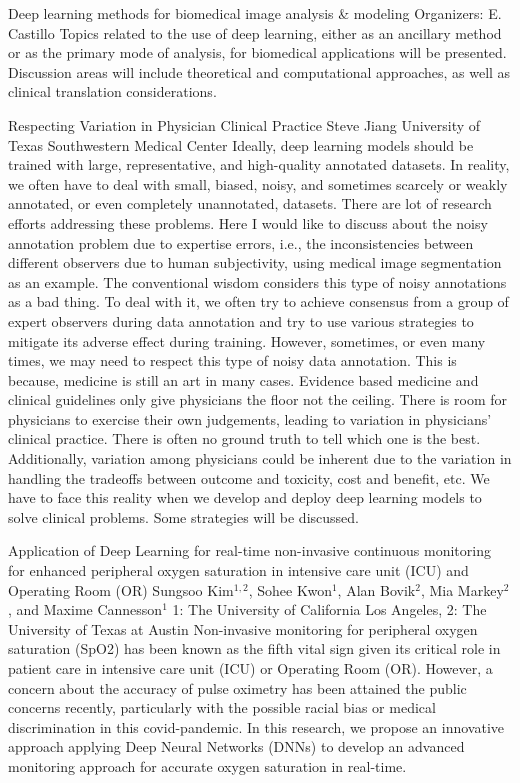 \label{mini05}

\miniabs
{Deep learning methods for biomedical image analysis \& modeling}
{Organizers: E. Castillo}
{Topics related to the use of deep learning, either as an ancillary method or as the primary mode of analysis, for biomedical applications will be presented. Discussion areas will include theoretical and computational approaches, as well as clinical translation considerations.}

\begin{addmargin}[2em]{0em}
\vspace{2ex}
\abs
{Respecting Variation in Physician Clinical Practice }
{Steve Jiang}
{University of Texas Southwestern Medical Center}
{Ideally, deep learning models should be trained with large, representative, and high-quality annotated datasets. In reality, we often have to deal with small, biased, noisy, and sometimes scarcely or weakly annotated, or even completely unannotated, datasets. There are lot of research efforts addressing these problems. Here I would like to discuss about the noisy annotation problem due to expertise errors, i.e., the inconsistencies between different observers due to human subjectivity, using medical image segmentation as an example. The conventional wisdom considers this type of noisy annotations as a bad thing. To deal with it, we often try to achieve consensus from a group of expert observers during data annotation and try to use various strategies to mitigate its adverse effect during training. However, sometimes, or even many times, we may need to respect this type of noisy data annotation. This is because, medicine is still an art in many cases. Evidence based medicine and clinical guidelines only give physicians the floor not the ceiling. There is room for physicians to exercise their own judgements, leading to variation in physicians’ clinical practice. There is often no ground truth to tell which one is the best. Additionally, variation among physicians could be inherent due to the variation in handling the tradeoffs between outcome and toxicity, cost and benefit, etc. We have to face this reality when we develop and deploy deep learning models to solve clinical problems. Some strategies will be discussed.}


\vspace{1.5ex}
\abs
{Application of Deep Learning for real-time non-invasive continuous monitoring for enhanced peripheral oxygen saturation in intensive care unit (ICU) and Operating Room (OR)}
{Sungsoo Kim$^{1,2}$, Sohee Kwon$^{1}$, Alan Bovik$^{2}$, Mia Markey$^{2}$, and Maxime Cannesson$^{1}$}
{1: The University of California Los Angeles, 2: The University of Texas at Austin}
{Non-invasive monitoring for peripheral oxygen saturation (SpO2) has been known as the fifth vital sign given its critical role in patient care in intensive care unit (ICU) or Operating Room (OR). However, a concern about the accuracy of pulse oximetry has been attained the public concerns recently, particularly with the possible racial bias or medical discrimination in this covid-pandemic. In this research, we propose an innovative approach applying Deep Neural Networks (DNNs) to develop an advanced monitoring approach for accurate oxygen saturation in real-time.}



\end{addmargin}
